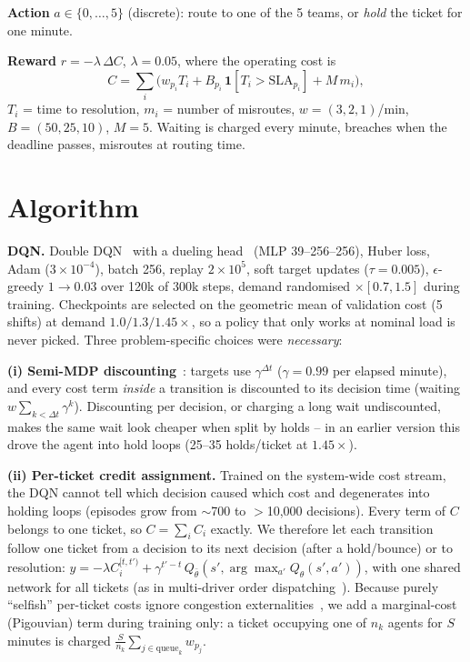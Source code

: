 \documentclass[10pt,twocolumn]{article}
\begin{document}
\textbf{Action} $a\in\{0,\dots,5\}$ (discrete): route to one of the 5 teams, or \emph{hold}
the ticket for one minute.

\textbf{Reward} $r=-\lambda\,\Delta C$, $\lambda{=}0.05$, where the operating cost is
\begin{equation}
C=\sum_i \Big(w_{p_i}T_i + B_{p_i}\,\mathbf{1}[T_i>\text{SLA}_{p_i}] + M\,m_i\Big),
\end{equation}
$T_i$ = time to resolution, $m_i$ = number of misroutes, $w{=}(3,2,1)$/min,
$B{=}(50,25,10)$, $M{=}5$. Waiting is charged every minute, breaches when the deadline passes,
misroutes at routing time.

\section{Algorithm}
\textbf{DQN.} Double DQN~\cite{vanhasselt2016} with a dueling head~\cite{wang2016}
(MLP 39--256--256), Huber loss, Adam ($3\!\times\!10^{-4}$), batch 256, replay $2\!\times\!10^5$,
soft target updates ($\tau{=}0.005$), $\epsilon$-greedy $1\!\to\!0.03$ over 120k of 300k steps,
demand randomised $\times[0.7,1.5]$ during training. Checkpoints are selected on the geometric
mean of validation cost (5 shifts) at demand $1.0/1.3/1.45\times$, so a policy that only works at
nominal load is never picked. Three problem-specific choices were \emph{necessary}:

\textbf{(i) Semi-MDP discounting}~\cite{bradtke1995}: targets use $\gamma^{\Delta t}$
($\gamma{=}0.99$ per elapsed minute), and every cost term \emph{inside} a transition is
discounted to its decision time (waiting $w\sum_{k<\Delta t}\gamma^k$). Discounting per decision,
or charging a long wait undiscounted, makes the same wait look cheaper when split by holds -- in
an earlier version this drove the agent into hold loops (25--35 holds/ticket at $1.45\times$).

\textbf{(ii) Per-ticket credit assignment.} Trained on the system-wide cost stream, the DQN
cannot tell which decision caused which cost and degenerates into holding loops (episodes grow
from $\sim$700 to $>$10{,}000 decisions). Every term of $C$ belongs to one ticket, so
$C=\sum_i C_i$ exactly. We therefore let each transition follow one
ticket from a decision to its next decision (after a hold/bounce) or to resolution:
$y=-\lambda C_i^{[t,t')}+\gamma^{t'-t}\,Q_{\bar\theta}(s',\arg\max_{a'}Q_\theta(s',a'))$, with
one shared network for all tickets (as in multi-driver order dispatching~\cite{tang2019}).
Because purely ``selfish'' per-ticket costs ignore congestion externalities~\cite{roughgarden2002},
we add a marginal-cost (Pigouvian) term during training only: a ticket occupying one of $n_k$
agents for $S$ minutes is charged $\frac{S}{n_k}\sum_{j\in\text{queue}_k}w_{p_j}$.
\end{document}
